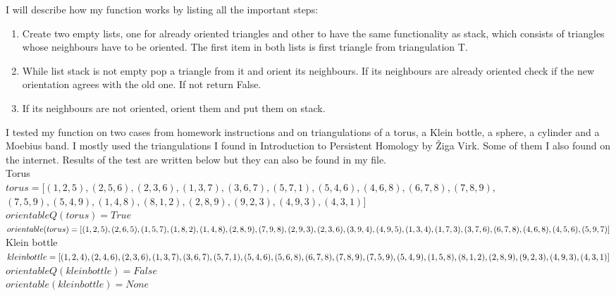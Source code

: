 \documentclass[12pt]{article}
\begin{document}
	I will describe how my function works by listing all the important steps: 
	
	\begin{enumerate}
		\item Create two empty lists, one for already oriented triangles and other to have the same  functionality as stack, which consists of triangles whose neighbours have to be oriented. The first item in both lists is first triangle from triangulation T.
		\item While list stack is not empty pop a triangle from it and orient its neighbours. If its neighbours are already oriented check if the new orientation agrees with the old one. If not return False. 
		\item If its neighbours are not oriented, orient them and put them on stack.
	\end{enumerate}

I tested my function on two cases from homework instructions and on triangulations of a torus, a Klein bottle, a sphere, a cylinder and a Moebius band. I mostly used the triangulations I found in Introduction to Persistent Homology by Žiga Virk. Some of them I also found on the internet. Results of the test are written below but they can also be found in my file.  \\

Torus \\
\noindent $torus = [(1,2,5),(2,5,6),(2,3,6),(1,3,7),(3,6,7),(5,7,1),(5,4,6),(4,6,8),(6,7,8),(7,8,9), $\\
$(7,5,9),(5,4,9),(1,4,8),(8,1,2),(2,8,9),(9,2,3),(4,9,3),(4,3,1)] $ \\
$orientableQ(torus) = True $ \\
$orientable(torus) = [(1, 2, 5), (2, 6, 5), (1, 5, 7), (1, 8, 2), (1, 4, 8), 
 (2, 8, 9), (7, 9, 8), (2, 9, 3), 
  \\(2, 3, 6), (3, 9, 4), (4, 9, 5),  (1, 3, 4), 
  (1, 7, 3), (3, 7, 6), (6, 7, 8), (4, 6, 8), (4, 5, 6), (5, 9, 7)]$ \\
  
  Klein bottle \\
  \noindent $kleinbottle = [(1,2,4),(2,4,6),(2,3,6),(1,3,7),(3,6,7),(5,7,1),(5,4,6),(5,6,8),(6,7,8),(7,8,9),
  \\ (7,5,9),(5,4,9),(1,5,8),(8,1,2),(2,8,9),(9,2,3),(4,9,3),(4,3,1)] $\\
  $orientableQ(kleinbottle) = False $ \\
  $orientable(kleinbottle) = None $\\
  
\end{document}
